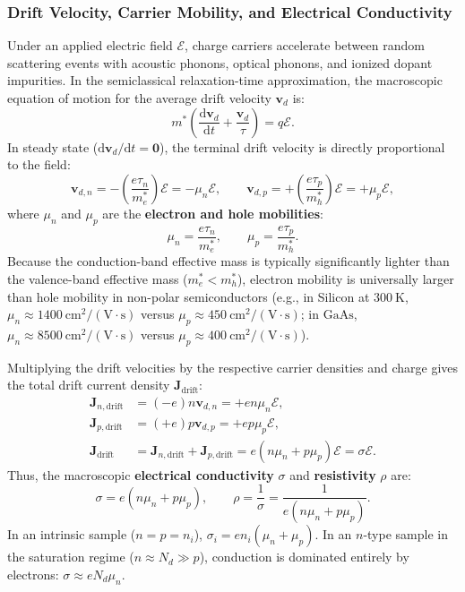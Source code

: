 \documentclass[11pt,a4paper]{article}
\newcommand{\dv}[2]{\frac{\mathrm{d}#1}{\mathrm{d}#2}}
\newcommand{\vb}[1]{\mathbf{#1}}
\newcommand{\dd}{\mathrm{d}}
\begin{document}
\subsubsection{Drift Velocity, Carrier Mobility, and Electrical Conductivity}
Under an applied electric field $\bm{\mathcal{E}}$, charge carriers accelerate between random scattering events with acoustic phonons, optical phonons, and ionized dopant impurities. In the semiclassical relaxation-time approximation, the macroscopic equation of motion for the average drift velocity $\vb{v}_d$ is:
\begin{equation}
    m^* \left(\dv{\vb{v}_d}{t} + \frac{\vb{v}_d}{\tau}\right) = q \bm{\mathcal{E}}.
\end{equation}
In steady state ($\dd \vb{v}_d/\dd t = \vb{0}$), the terminal drift velocity is directly proportional to the field:
\begin{equation}
    \vb{v}_{d,n} = -\left(\frac{e\tau_n}{m_e^*}\right)\bm{\mathcal{E}} = -\mu_n \bm{\mathcal{E}}, \qquad \vb{v}_{d,p} = +\left(\frac{e\tau_p}{m_h^*}\right)\bm{\mathcal{E}} = +\mu_p \bm{\mathcal{E}},
\end{equation}
where $\mu_n$ and $\mu_p$ are the \textbf{electron and hole mobilities}:
\begin{equation}
    \boxed{\mu_n = \frac{e\tau_n}{m_e^*}, \qquad \mu_p = \frac{e\tau_p}{m_h^*}.}
    \label{eq:mobility_master}
\end{equation}
Because the conduction-band effective mass is typically significantly lighter than the valence-band effective mass ($m_e^* < m_h^*$), electron mobility is universally larger than hole mobility in non-polar semiconductors (e.g., in Silicon at $300\ \mathrm{K}$, $\mu_n \approx 1400\ \mathrm{cm^2/(V\cdot s)}$ versus $\mu_p \approx 450\ \mathrm{cm^2/(V\cdot s)}$; in $\text{GaAs}$, $\mu_n \approx 8500\ \mathrm{cm^2/(V\cdot s)}$ versus $\mu_p \approx 400\ \mathrm{cm^2/(V\cdot s)}$).

Multiplying the drift velocities by the respective carrier densities and charge gives the total drift current density $\vb{J}_{\mathrm{drift}}$:
\begin{align}
    \vb{J}_{n,\mathrm{drift}} &= (-e)n\vb{v}_{d,n} = +e n \mu_n \bm{\mathcal{E}}, \\
    \vb{J}_{p,\mathrm{drift}} &= (+e)p\vb{v}_{d,p} = +e p \mu_p \bm{\mathcal{E}}, \\
    \vb{J}_{\mathrm{drift}} &= \vb{J}_{n,\mathrm{drift}} + \vb{J}_{p,\mathrm{drift}} = e(n\mu_n + p\mu_p)\bm{\mathcal{E}} = \sigma \bm{\mathcal{E}}.
\end{align}
Thus, the macroscopic \textbf{electrical conductivity} $\sigma$ and \textbf{resistivity} $\rho$ are:
\begin{equation}
    \boxed{\sigma = e(n\mu_n + p\mu_p), \qquad \rho = \frac{1}{\sigma} = \frac{1}{e(n\mu_n + p\mu_p)}.}
    \label{eq:semicon_conductivity_master}
\end{equation}
In an intrinsic sample ($n = p = n_i$), $\sigma_i = e n_i(\mu_n + \mu_p)$. In an $n$-type sample in the saturation regime ($n \approx N_d \gg p$), conduction is dominated entirely by electrons: $\sigma \approx e N_d \mu_n$.
\end{document}
